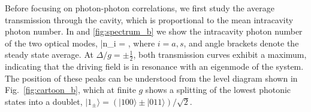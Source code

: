 Before focusing on photon-photon correlations, we first
study
the average transmission through the cavity, which is proportional
to the mean intracavity photon number. In
 and \ref{fig:spectrum_b} we show the 
intracavity photon number of the
two optical modes,
\bel
	\label{eq:nAvg}
	\bar n_i = ,
\eel
where $i =a,s$, and angle brackets denote the steady state average.
At $\Delta/g =
\pm \frac{1}{2}$, both transmission curves exhibit a maximum,
indicating that the driving field is in resonance 
with an eigenmode of the system.
The position of these peaks can be  understood from the level diagram shown
in Fig.~\ref{fig:cartoon_b}, which at finite $g$ shows a splitting
of the lowest photonic states into a doublet, $|1_\pm\rangle=(|100\rangle
\pm|011\rangle)/\sqrt{2}$.


